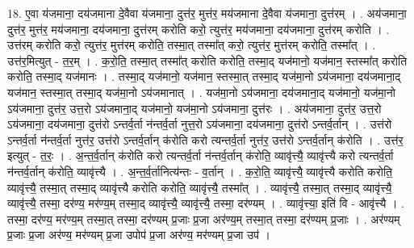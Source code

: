 \documentclass[17pt]{extarticle}
\begin{document}
18. ए॒वा य॑जमाना॒ दय॑जमाना दे॒वैवा य॑जमाना॒ दुत्त॑र॒ मुत्त॑र॒ मय॑जमाना दे॒वैवा य॑जमाना॒ दुत्त॑रम् । . अय॑जमाना॒ दुत्त॑र॒ मुत्त॑र॒ मय॑जमाना॒ दय॑जमाना॒ दुत्त॑रम् करोति करो॒ त्युत्त॑र॒ मय॑जमाना॒ दय॑जमाना॒ दुत्त॑रम् करोति । . उत्त॑रम् करोति करो॒ त्युत्त॑र॒ मुत्त॑रम् करोति॒ तस्मा॒त् तस्मा᳚त् करो॒ त्युत्त॑र॒ मुत्त॑रम् करोति॒ तस्मा᳚त् । . उत्त॑र॒मित्युत् - त॒र॒म् । . क॒रो॒ति॒ तस्मा॒त् तस्मा᳚त् करोति करोति॒ तस्मा॒द् यज॑मानो॒ यज॑मान॒ स्तस्मा᳚त् करोति करोति॒ तस्मा॒द् यज॑मानः । . तस्मा॒द् यज॑मानो॒ यज॑मान॒ स्तस्मा॒त् तस्मा॒द् यज॑मा॒नो ऽय॑जमाना॒ दय॑जमाना॒द् यज॑मान॒ स्तस्मा॒त् तस्मा॒द् यज॑मा॒नो ऽय॑जमानात् । . यज॑मा॒नो ऽय॑जमाना॒ दय॑जमाना॒द् यज॑मानो॒ यज॑मा॒नो ऽय॑जमाना॒ दुत्त॑र॒ उत्त॒रो ऽय॑जमाना॒द् यज॑मानो॒ यज॑मा॒नो ऽय॑जमाना॒ दुत्त॑रः । . अय॑जमाना॒ दुत्त॑र॒ उत्त॒रो ऽय॑जमाना॒ दय॑जमाना॒ दुत्त॑रो ऽन्तर्व॒र्ता न॑न्तर्व॒र्ता नुत्त॒रो ऽय॑जमाना॒ दय॑जमाना॒ दुत्त॑रो ऽन्तर्व॒र्तान् । . उत्त॑रो ऽन्तर्व॒र्ता न॑न्तर्व॒र्ता नुत्त॑र॒ उत्त॑रो ऽन्तर्व॒र्तान् क॑रोति करो त्यन्तर्व॒र्ता नुत्त॑र॒ उत्त॑रो ऽन्तर्व॒र्तान् क॑रोति । . उत्त॑र॒ इत्युत् - त॒रः॒ । . अ॒न्त॒र्व॒र्तान् क॑रोति करो त्यन्तर्व॒र्ता न॑न्तर्व॒र्तान् क॑रोति॒ व्यावृ॑त्त्यै॒ व्यावृ॑त्त्यै करो त्यन्तर्व॒र्ता न॑न्तर्व॒र्तान् क॑रोति॒ व्यावृ॑त्त्यै । . अ॒न्त॒र्व॒र्तानित्य॑न्तः - व॒र्तान् । . क॒रो॒ति॒ व्यावृ॑त्त्यै॒ व्यावृ॑त्त्यै करोति करोति॒ व्यावृ॑त्त्यै॒ तस्मा॒त् तस्मा॒द् व्यावृ॑त्त्यै करोति करोति॒ व्यावृ॑त्त्यै॒ तस्मा᳚त् । . व्यावृ॑त्त्यै॒ तस्मा॒त् तस्मा॒द् व्यावृ॑त्त्यै॒ व्यावृ॑त्त्यै॒ तस्मा॒ दर॑ण्य॒ मर॑ण्य॒म् तस्मा॒द् व्यावृ॑त्त्यै॒ व्यावृ॑त्त्यै॒ तस्मा॒ दर॑ण्यम् । . व्यावृ॑त्त्या॒ इति॑ वि - आवृ॑त्त्यै । . तस्मा॒ दर॑ण्य॒ मर॑ण्य॒म् तस्मा॒त् तस्मा॒ दर॑ण्यम् प्र॒जाः प्र॒जा अर॑ण्य॒म् तस्मा॒त् तस्मा॒ दर॑ण्यम् प्र॒जाः । . अर॑ण्यम् प्र॒जाः प्र॒जा अर॑ण्य॒ मर॑ण्यम् प्र॒जा उपोप॑ प्र॒जा अर॑ण्य॒ मर॑ण्यम् प्र॒जा उप॑ । \newline
\end{document}
